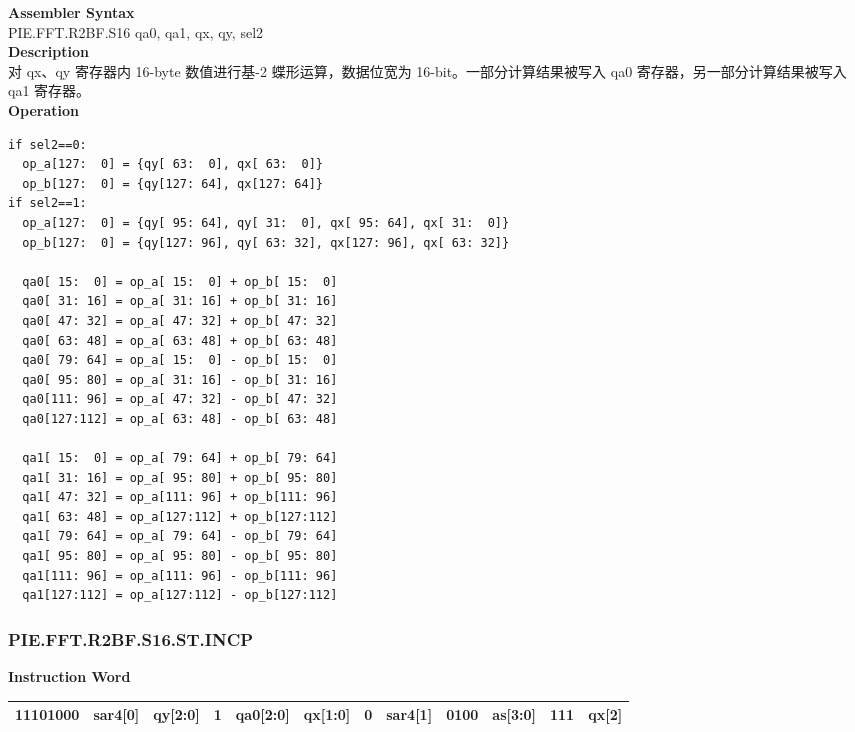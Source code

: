 \textbf{Assembler Syntax} \\
PIE.FFT.R2BF.S16 qa0, qa1, qx, qy, sel2 \\
\textbf{Description} \\
对 qx、qy 寄存器内 16-byte 数值进行基-2 蝶形运算，数据位宽为 16-bit。一部分计算结果被写入 qa0 寄存器，另一部分计算结果被写入 qa1 寄存器。\\
\textbf{Operation}
\begin{lstlisting}
if sel2==0:
  op_a[127:  0] = {qy[ 63:  0], qx[ 63:  0]}
  op_b[127:  0] = {qy[127: 64], qx[127: 64]}
if sel2==1:
  op_a[127:  0] = {qy[ 95: 64], qy[ 31:  0], qx[ 95: 64], qx[ 31:  0]}
  op_b[127:  0] = {qy[127: 96], qy[ 63: 32], qx[127: 96], qx[ 63: 32]}

  qa0[ 15:  0] = op_a[ 15:  0] + op_b[ 15:  0]
  qa0[ 31: 16] = op_a[ 31: 16] + op_b[ 31: 16]
  qa0[ 47: 32] = op_a[ 47: 32] + op_b[ 47: 32]
  qa0[ 63: 48] = op_a[ 63: 48] + op_b[ 63: 48]
  qa0[ 79: 64] = op_a[ 15:  0] - op_b[ 15:  0]
  qa0[ 95: 80] = op_a[ 31: 16] - op_b[ 31: 16]
  qa0[111: 96] = op_a[ 47: 32] - op_b[ 47: 32]
  qa0[127:112] = op_a[ 63: 48] - op_b[ 63: 48]

  qa1[ 15:  0] = op_a[ 79: 64] + op_b[ 79: 64]
  qa1[ 31: 16] = op_a[ 95: 80] + op_b[ 95: 80]
  qa1[ 47: 32] = op_a[111: 96] + op_b[111: 96]
  qa1[ 63: 48] = op_a[127:112] + op_b[127:112]
  qa1[ 79: 64] = op_a[ 79: 64] - op_b[ 79: 64]
  qa1[ 95: 80] = op_a[ 95: 80] - op_b[ 95: 80]
  qa1[111: 96] = op_a[111: 96] - op_b[111: 96]
  qa1[127:112] = op_a[127:112] - op_b[127:112]
\end{lstlisting}

\newpage
\subsubsection{PIE.FFT.R2BF.S16.ST.INCP}\label{instruction:PIEFFTR2BFS16STINCP}
\setlength\tabcolsep{6pt}
\textbf{Instruction Word} \\
\begin{tabular}{|c|c|c|c|c|c|c|c|c|c|c|c|}
	\hline
	11101000 & sar4[0] & qy[2:0] & 1 & qa0[2:0] & qx[1:0] & 0 & sar4[1] & 0100 & as[3:0] & 111 & qx[2] \\
	\hline
\end{tabular}

